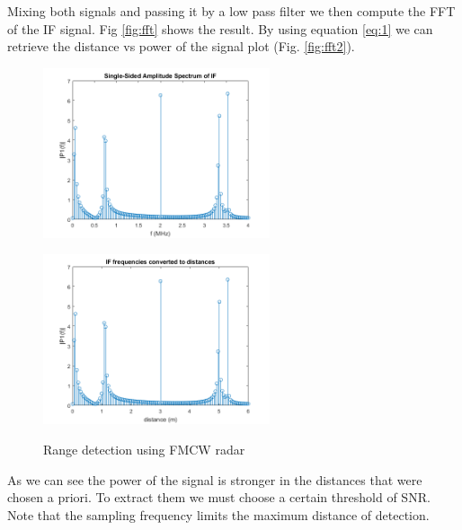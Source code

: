 Mixing both signals and passing it by a low pass filter we then compute the \ac{FFT} of the \ac{IF} signal. Fig \ref{fig:fft} shows the result. By using equation \ref{eq:1} we can retrieve the distance vs power of the signal plot (Fig. \ref{fig:fft2}). 
\begin{figure}[h] 
    \begin{minipage}[b]{.49\linewidth}
        \includegraphics[height=5cm,width=\linewidth]{imgs/chapter2/FFT.png}
        \label{fig:fft}
    \end{minipage}
    \begin{minipage}[b]{.49\linewidth}
        \includegraphics[height=5cm,width=\linewidth]{imgs/chapter2/distance.png}
        \label{fig:fft2}
    \end{minipage}
    \caption{Range detection using \ac{FMCW} \ac{radar}}
    \label{fig:distance determination}
\end{figure}
As we can see the power of the signal is stronger in the distances that were chosen a priori. To extract them we must choose a certain threshold of \ac{SNR}. Note that the sampling frequency limits the maximum distance of detection.

